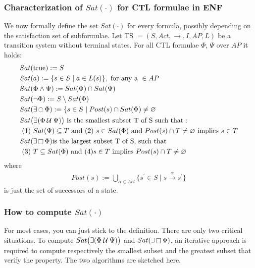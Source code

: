\documentclass{article}
\begin{document}
\subsubsection*{Characterization of $Sat(\cdot)$ for CTL formulae in ENF}
We now formally define the set $Sat(\cdot)$ for every formula, possibly depending on the satisfaction set of subformulae. Let TS $ = (S, Act, \rightarrow, I, AP, L)$ be a transition system without terminal states. For all CTL formulae $\Phi$, $\Psi$ over $AP$ it holds:
\begin{align*}
    & Sat(\text{true}) := S \\
    & Sat(a) := \{ s \in S \mid a \in L(s) \}, \text{ for any a } \in AP \\ 
    & Sat( \Phi \land \Psi) := Sat(\Phi) \cap Sat(\Psi) \\ 
    & Sat(\neg \Phi) := S \setminus Sat(\Phi) \\ 
    & Sat(\exists \mathop{\ocircle}{\Phi}) := \{ s \in S \mid Post(s) \cap Sat(\Phi) \neq \varnothing \\
    & Sat\big(\exists (\Phi \mathbin{\mathcal{U}} \Psi) \big) \text{ is the smallest subset T of S such that}: \\
    & \text{   (1)   } Sat(\Psi) \subseteq T \text{ and (2) } s \in Sat(\Phi) \text{ and } Post(s) \cap T \neq \varnothing \text{ implies } s \in T \\
    & Sat(\exists \mathop{\square} \Phi) \text{is the largest subset T of S, such that }\\
    & \text{   (3)   } T \subseteq Sat(\Phi) \text{ and } (4) s \in T \text{ implies } Post(s) \cap T \neq \varnothing \\
\end{align*}
where
\begin{align*}
    Post(s) := \bigcup_{\alpha \in Act} \{ s^{'} \in S \mid s \xrightarrow{\alpha} s^{'} \}
\end{align*}
is just the set of successors of a state.

\subsubsection{How to compute $Sat(\cdot)$}
For most cases, you can just stick to the definition. There are only two critical situations.
To compute $Sat\big(\exists (\Phi \mathbin{\mathcal{U}} \Psi) \big)$ and $Sat(\exists \mathop{\square} \Phi)$, an iterative approach is required to compute respectively the smallest subset and the greatest subset that verify the property. The two algorithms are sketched here.
\end{document}
